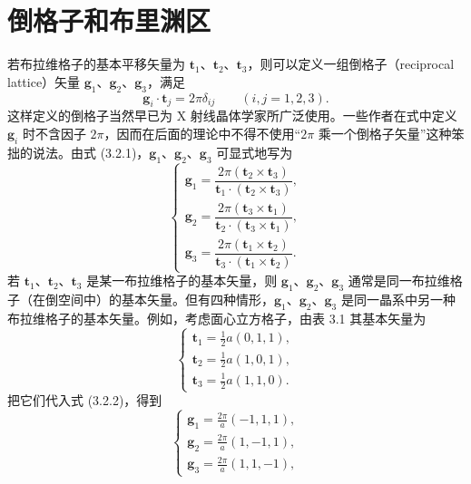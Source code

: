 \section{倒格子和布里渊区}

若布拉维格子的基本平移矢量为 $\mathbf{t}_{1}$、$\mathbf{t}_{2}$、$\mathbf{t}_{3}$，则可以定义一组倒格子（reciprocal lattice）矢量 $\mathbf{g}_{1}$、$\mathbf{g}_{2}$、$\mathbf{g}_{3}$，满足
\begin{equation*}
\mathbf{g}_{i} \cdot \mathbf{t}_{j} = 2\pi\delta_{ij} \qquad (i, j = 1, 2, 3).
\tag{3.2.1}
\end{equation*}
这样定义的倒格子当然早已为 X 射线晶体学家所广泛使用。一些作者在式中定义 $\mathbf{g}_{i}$ 时不含因子 $2\pi$，因而在后面的理论中不得不使用“$2\pi$ 乘一个倒格子矢量”这种笨拙的说法。由式 (3.2.1)，$\mathbf{g}_{1}$、$\mathbf{g}_{2}$、$\mathbf{g}_{3}$ 可显式地写为
\begin{equation*}
\left\{
\begin{array}{l}
\mathbf{g}_{1} = \dfrac{2\pi(\mathbf{t}_{2} \times \mathbf{t}_{3})}{\mathbf{t}_{1} \cdot (\mathbf{t}_{2} \times \mathbf{t}_{3})}, \\[2ex]
\mathbf{g}_{2} = \dfrac{2\pi(\mathbf{t}_{3} \times \mathbf{t}_{1})}{\mathbf{t}_{2} \cdot (\mathbf{t}_{3} \times \mathbf{t}_{1})}, \\[2ex]
\mathbf{g}_{3} = \dfrac{2\pi(\mathbf{t}_{1} \times \mathbf{t}_{2})}{\mathbf{t}_{3} \cdot (\mathbf{t}_{1} \times \mathbf{t}_{2})}.
\end{array}
\right.
\tag{3.2.2}
\end{equation*}
若 $\mathbf{t}_{1}$、$\mathbf{t}_{2}$、$\mathbf{t}_{3}$ 是某一布拉维格子的基本矢量，则 $\mathbf{g}_{1}$、$\mathbf{g}_{2}$、$\mathbf{g}_{3}$ 通常是同一布拉维格子（在倒空间中）的基本矢量。但有四种情形，$\mathbf{g}_{1}$、$\mathbf{g}_{2}$、$\mathbf{g}_{3}$ 是同一晶系中另一种布拉维格子的基本矢量。例如，考虑面心立方格子，由表 3.1 其基本矢量为
\begin{equation*}
\left\{
\begin{array}{l}
\mathbf{t}_{1} = \frac{1}{2}a(0, 1, 1), \\
\mathbf{t}_{2} = \frac{1}{2}a(1, 0, 1), \\
\mathbf{t}_{3} = \frac{1}{2}a(1, 1, 0).
\end{array}
\right.
\tag{3.2.3}
\end{equation*}
把它们代入式 (3.2.2)，得到
\begin{equation*}
\left\{
\begin{array}{l}
\mathbf{g}_{1} = \frac{2\pi}{a}(-1, 1, 1), \\
\mathbf{g}_{2} = \frac{2\pi}{a}(1, -1, 1), \\
\mathbf{g}_{3} = \frac{2\pi}{a}(1, 1, -1),
\end{array}
\right.
\tag{3.2.4}
\end{equation*}
